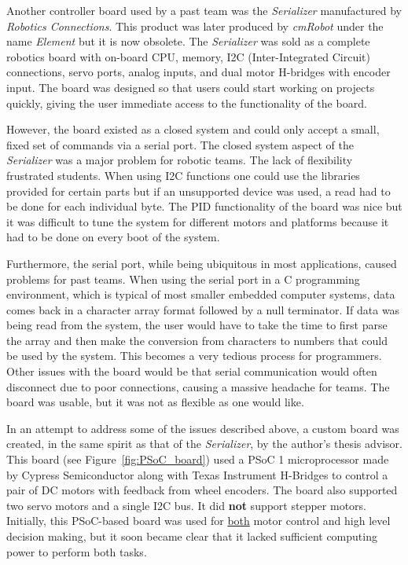 \documentclass[12pt,oneside,final]{siuethesis}
\theoremstyle{definition}
\begin{document}
Another controller board used by a past team was the \emph{Serializer} manufactured by \emph{Robotics Connections}. This product was later produced by \emph{cmRobot} under the name \emph{Element} but it is now obsolete.  The \emph{Serializer} was sold as a complete robotics board with on-board CPU, memory, I2C (Inter-Integrated Circuit) connections, servo ports, analog inputs, and dual motor H-bridges with encoder input. The board was designed so that users could start working on projects quickly, giving the user immediate access to the functionality of the board. 

However, the board existed as a closed system and could only accept a small, fixed set of commands via a serial port. The closed system aspect of the \emph{Serializer} was a major problem for robotic teams. The lack of flexibility frustrated students. When using I2C functions one could use the libraries provided for certain parts but if an unsupported device was used, a read had to be done for each individual byte. The PID functionality of the board was nice but it was difficult to tune the system for different motors and platforms because it had to be done on every boot of the system. 

Furthermore, the serial port, while being ubiquitous in most applications, caused problems for past teams. When using the serial port in a C programming environment, which is typical of most smaller embedded computer systems, data comes back in a character array format followed by a null terminator. If data was being read from the system, the user would have to take the time to first parse the array and then make the conversion from characters to numbers that could be used by the system. This becomes a very tedious process for programmers. Other issues with the board would be that serial communication would often disconnect due to poor connections, causing a massive headache for teams. The board was usable, but it was not as flexible as one would like.  

In an attempt to address some of the issues described above, a custom board was created, in the same spirit as that of the \emph{Serializer}, by the author's thesis advisor. This board (see Figure~\ref{fig:PSoC_board}) used a PSoC 1 microprocessor made by Cypress Semiconductor along with Texas Instrument H-Bridges to control a pair of DC motors with feedback from wheel encoders. The board also supported two servo motors and a single I2C bus. It did \textbf{not} support stepper motors. Initially, this PSoC-based board was used for \underline{both} motor control and high level decision making, but it soon became clear that it lacked sufficient computing power to perform both tasks.
\end{document}
